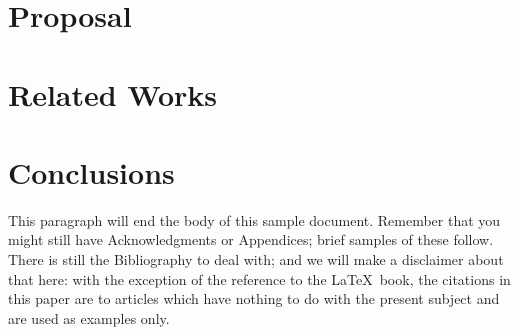 \section{Proposal}
\section{Related Works}

\section{Conclusions}
This paragraph will end the body of this sample document.
Remember that you might still have Acknowledgments or
Appendices; brief samples of these
follow.  There is still the Bibliography to deal with; and
we will make a disclaimer about that here: with the exception
of the reference to the \LaTeX\ book, the citations in
this paper are to articles which have nothing to
do with the present subject and are used as
examples only.



